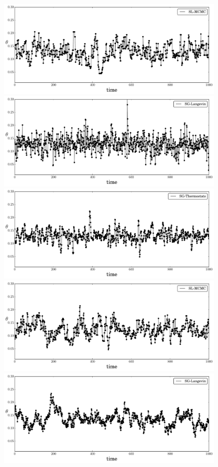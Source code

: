\documentclass[]{article}
\begin{document}
\begin{figure}[t]
\setlength{\linewidth}{\textwidth}
\setlength{\hsize}{\textwidth}
\begin{center}  
\includegraphics[width=0.65\columnwidth]{./images/exp-SL-MCMC-theta-timeseries-omega-rate-100p0-chain0.pdf}
\includegraphics[width=0.65\columnwidth]{./images/exp-SG-Langevin-theta-timeseries-omega-rate-100p0-chain0.pdf}
\includegraphics[width=0.65\columnwidth]{./images/exponential/exp3-SG-Thermostats-theta-timeseries-omega-rate-100p0-chain0.pdf}
\includegraphics[width=0.65\columnwidth]{./images/exponential/exp2-SL-MCMC-theta-timeseries-omega-rate-0p1-chain3.pdf}
\includegraphics[width=0.65\columnwidth]{./images/exponential/exp2-SG-Langevin-theta-timeseries-omega-rate-0p1-chain3.pdf}

\end{center}
\end{figure}
\end{document}
